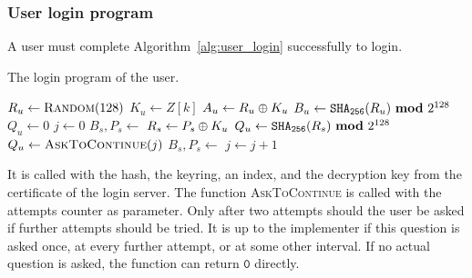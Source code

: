 \subsubsection{User login program}
A user must complete Algorithm~\vref{alg:user_login} successfully to login.
\begin{algorithm}
\caption{The login program of the user.}
\label{alg:user_login}
\begin{algorithmic}[1]
\State $R_u\gets\Call{Random}{128}$
\State $K_u\gets Z[k]$
\State $A_u\gets R_u\oplus K_u$
\State $B_u\gets\texttt{\ensuremath{\mathtt{SHA_{256}}}}(R_u)\ \textbf{mod}\ 2^{128}$
\State $Q_u\gets 0$
\State $j\gets 0$
\State $B_s,P_s\gets$
	
\State $R_s\gets P_s\oplus K_u$
\State $Q_u\gets\texttt{\ensuremath{\mathtt{SHA_{256}}}}(R_s)\ \textbf{mod}\ 2^{128}$
\Else
\State $Q_u\gets\Call{AskToContinue}{j}$
\EndIf
\State $B_s,P_s\gets$
\State $j\gets j+1$
\EndWhile
{} 
 
 
\State{} 
\EndIf
\EndIf
\EndIf
\EndProcedure
\end{algorithmic}
\end{algorithm}
It is called with the hash, the keyring, an index, and the decryption key from the certificate of the login server.
The function \textsc{AskToContinue} is called with the attempts counter as parameter.
Only after two attempts should the user be asked if further attempts should be tried.
It is up to the implementer if this question is asked once,
at every further attempt,
or at some other interval.
If no actual question is asked,
the function can return $\mathtt{0}$ directly.
